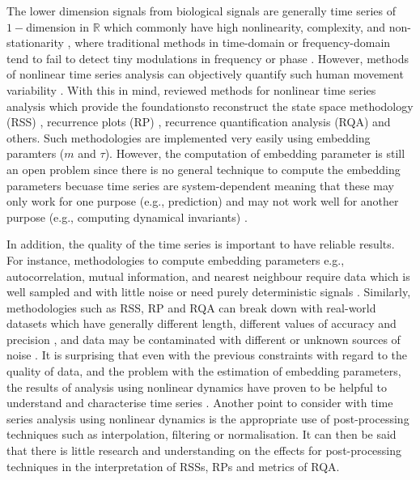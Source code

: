 The lower dimension signals from biological signals are generally time series 
of $1-$dimension in $\mathbb{R}$ which commonly have 
high nonlinearity, complexity, and non-stationarity \cite{gomezgarcia2014},
where traditional methods in time-domain or frequency-domain 
tend to fail to detect tiny modulations in frequency or phase \cite{marwan2011}.
However, methods of nonlinear time series analysis can objectively quantify such 
human movement variability \cite{Quintana-Duque2012, Quintana-Duque2016, sama2013, 
frank2010, gomezgarcia2014, marwan2011, stergiou2011, packard1980}.
With this in mind, \cite{bradley2015} reviewed methods for
nonlinear time series analysis which provide the foundationsto reconstruct the state space methodology (RSS) \cite{takens1981},
recurrence plots (RP) \cite{eckmann1987}, 
recurrence quantification analysis (RQA) \cite{zbilut1992} and others.
Such methodologies are implemented very easily using embedding paramters ($m$ and $\tau$).
However, the computation of embedding parameter is still an open problem
since there is no general technique to compute the embedding parameters 
becuase time series are system-dependent meaning that these may only work 
for one purpose (e.g., prediction) and may not work well for another purpose
(e.g., computing dynamical invariants) \cite{bradley2015}.


In addition, the quality of the time series is important to have 
reliable results. For instance, methodologies to compute embedding parameters 
e.g., autocorrelation, mutual information, and nearest neighbour 
require data which is well sampled and with little noise \cite{garland2016} 
or need purely deterministic signals \cite{kantz2003}.
Similarly, methodologies such as RSS, RP and RQA can break down with real-world 
datasets which have generally different length, 
different values of accuracy and precision \cite{frank2010},
and data may be contaminated with different or unknown sources of noise \cite{garland2016}.
It is surprising that even with the previous constraints with regard to 
the quality of data, and the problem with the estimation of embedding parameters,
the results of analysis using nonlinear dynamics 
have proven to be helpful to understand and characterise time series 
\cite{Quintana-Duque2012, Quintana-Duque2016, sama2013, frank2010,
gomezgarcia2014, marwan2011, stergiou2011, bradley2015}.
Another point to consider with time series analysis using nonlinear dynamics
is the appropriate use of post-processing techniques such as 
interpolation, filtering or normalisation.
It can then be said that there is little research and understanding 
on the effects for post-processing techniques in the interpretation of RSSs, RPs 
and metrics of RQA.


